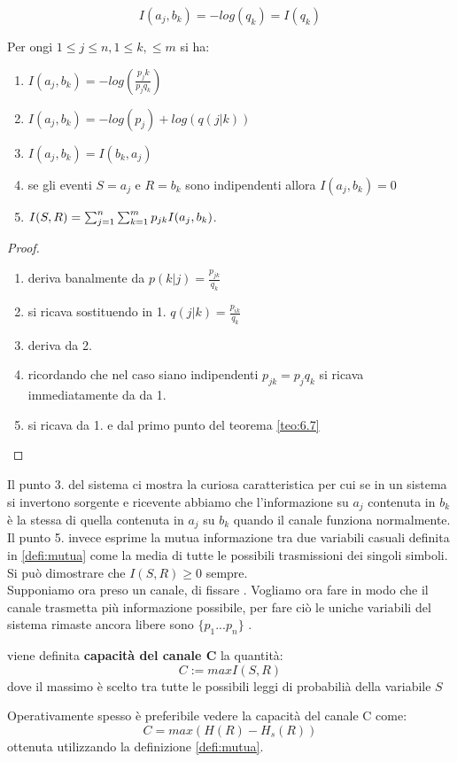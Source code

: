 $$I(a_j,b_k)=-log(q_k)=I(q_k)$$
\begin{teo}
Per ongi $1\leq j \leq n , 1 \leq k, \leq m$ si ha:
\begin{enumerate}
\item $I(a_j,b_k)=-log(\frac{p_jk}{p_j q_k})$
\item $I(a_j,b_k)=-log(p_j)+log(q(j|k))$
\item $I(a_j,b_k)=I(b_k,a_j)$
\item se gli eventi $S=a_j$ e $R=b_k$ sono indipendenti allora $I(a_j,b_k)=0$
\item $I(S,R)=\sum_{j=1}^n \sum_{k=1}^m p_{jk}I(a_j,b_k)$.
\end{enumerate}
\end{teo}
\begin{proof}
\begin{enumerate}
\item deriva banalmente da $p(k|j)=\frac{p_{jk}}{q_k}$
\item si ricava sostituendo in 1. $q(j|k)=\frac{p_{ik}}{q_k}$
\item deriva da 2.
\item ricordando che nel caso siano indipendenti $p_{jk}=p_jq_k$ si ricava immediatamente da da 1.
\item si ricava da 1. e dal primo punto del teorema \ref{teo:6.7}
\end{enumerate}
\end{proof}

Il punto 3. del sistema ci mostra la curiosa caratteristica per cui se in un sistema si invertono sorgente e ricevente abbiamo che l'informazione su $a_j$ contenuta in $b_k$ è la stessa di quella contenuta in $a_j$ su $b_k$ quando il canale funziona normalmente. Il punto 5. invece esprime la mutua informazione tra due variabili casuali definita in \ref{defi:mutua} come la media di tutte le possibili trasmissioni dei singoli simboli. Si può dimostrare che $I(S,R)\geq 0$ sempre.\\

Supponiamo ora preso un canale, di fissare \lepc . Vogliamo ora fare in modo che il canale trasmetta più informazione possibile, per fare ciò le uniche variabili del sistema rimaste ancora libere sono $\{p_1...p_n \}$ .
\begin{defi}
viene definita \textbf{capacità del canale C} la quantità:
\begin{equation}
C:=max I(S,R)
\end{equation}
dove il massimo è scelto tra tutte le possibili leggi di probabilià della variabile $S$
\end{defi}
Operativamente spesso è preferibile vedere la capacità del canale C come:
\begin{equation}
C=max(H(R)-H_s(R))
\end{equation}
ottenuta utilizzando la definizione \ref{defi:mutua}.

